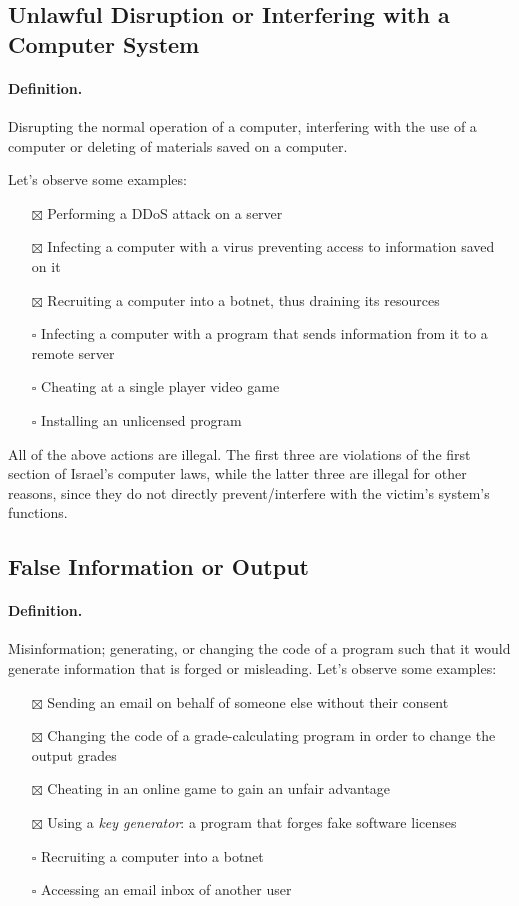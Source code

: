 \subsection{Unlawful Disruption or Interfering with a Computer System}

\paragraph{Definition.} Disrupting the normal operation of a computer,
interfering with the use of a computer or deleting of materials saved on a
computer.

Let's observe some examples:
\begin{itemize}
    \item[$\boxtimes$] Performing a DDoS attack on a server
    \item[$\boxtimes$] Infecting a computer with a virus preventing access to
    information saved on it
    \item[$\boxtimes$] Recruiting a computer into a botnet, thus draining its
    resources
    \item[$\square$] Infecting a computer with a program that sends information
    from it to a remote server
    \item[$\square$] Cheating at a single player video game
    \item[$\square$] Installing an unlicensed program
\end{itemize}

All of the above actions are illegal. The first three are violations of the
first section of Israel's computer laws, while the latter three are illegal for
other reasons, since they do not directly prevent/interfere with the victim's
system's functions.

\subsection{False Information or Output}

\paragraph{Definition.} Misinformation; generating, or changing the code of a
program such that it would generate information that is forged or misleading.
Let's observe some examples:
\begin{itemize}
    \item[$\boxtimes$] Sending an email on behalf of someone else without their
    consent
    \item[$\boxtimes$] Changing the code of a grade-calculating program in order
    to change the output grades
    \item[$\boxtimes$] Cheating in an online game to gain an unfair advantage
    \item[$\boxtimes$] Using a \textit{key generator}: a program that forges
    fake software licenses
    \item[$\square$] Recruiting a computer into a botnet
    \item[$\square$] Accessing an email inbox of another user
\end{itemize}

